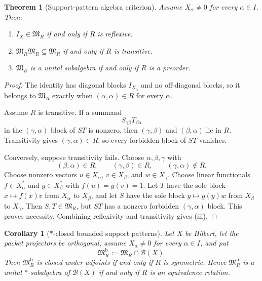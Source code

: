 \documentclass[11pt]{article}
\newtheorem{theorem}{Theorem}[section]
\newtheorem{corollary}[corollary]{Corollary}
\theoremstyle{definition}
\theoremstyle{remark}
\theoremstyle{definition}\newtheorem{example}[theorem]{Example}
\newcommand{\RecordID}[1]{\label{record:#1}}
\newcommand{\Depends}[1]{}
\begin{document}
\begin{theorem}[Support-pattern algebra criterion]
\label{thm:support-pattern}
Assume $X_\alpha\neq0$ for every $\alpha\in I$.  Then:
\begin{enumerate}[label=(\roman*)]
\item $I_X\in\mathfrak M_R$ if and only if $R$ is reflexive.
\item $\mathfrak M_R\mathfrak M_R\subseteq\mathfrak M_R$ if and only if $R$ is transitive.
\item $\mathfrak M_R$ is a unital subalgebra if and only if $R$ is a preorder.
\end{enumerate}
\end{theorem}
\RecordID{PSC-I-T-SUPPORT-PATTERN-ALGEBRA}
\Depends{PSC-I-T-BLOCK-MULTIPLICATION.}

\begin{proof}
The identity has diagonal blocks $I_{X_\alpha}$ and no off-diagonal blocks, so it belongs to $\mathfrak M_R$ exactly when $(\alpha,\alpha)\in R$ for every $\alpha$.

Assume $R$ is transitive.  If a summand
\[
S_{\gamma\beta}T_{\beta\alpha}
\]
in the $(\gamma,\alpha)$ block of $ST$ is nonzero, then $(\gamma,\beta)$ and $(\beta,\alpha)$ lie in $R$.  Transitivity gives $(\gamma,\alpha)\in R$, so every forbidden block of $ST$ vanishes.

Conversely, suppose transitivity fails.  Choose $\alpha,\beta,\gamma$ with
\[
(\beta,\alpha)\in R,
\qquad
(\gamma,\beta)\in R,
\qquad
(\gamma,\alpha)\notin R.
\]
Choose nonzero vectors $u\in X_\alpha$, $v\in X_\beta$, and $w\in X_\gamma$.  Choose linear functionals $f\in X_\alpha^*$ and $g\in X_\beta^*$ with $f(u)=g(v)=1$.  Let $T$ have the sole block $x\mapsto f(x)v$ from $X_\alpha$ to $X_\beta$, and let $S$ have the sole block $y\mapsto g(y)w$ from $X_\beta$ to $X_\gamma$.  Then $S,T\in\mathfrak M_R$, but $ST$ has a nonzero forbidden $(\gamma,\alpha)$ block.  This proves necessity.  Combining reflexivity and transitivity gives (iii).
\end{proof}

\begin{corollary}[$*$-closed bounded support patterns]
\label{cor:star-support}
Let $X$ be Hilbert, let the packet projectors be orthogonal, assume $X_\alpha\neq0$ for every $\alpha\in I$, and put
\[
\mathfrak M_R^{\mathrm b}:=\mathfrak M_R\cap\mathcal B(X).
\]
Then $\mathfrak M_R^{\mathrm b}$ is closed under adjoints if and only if $R$ is symmetric.  Hence $\mathfrak M_R^{\mathrm b}$ is a unital $*$-subalgebra of $\mathcal B(X)$ if and only if $R$ is an equivalence relation.
\end{corollary}
\RecordID{PSC-I-C-SUPPORT-PATTERN-STAR}
\Depends{PSC-I-C-ADJOINT-REVERSAL and PSC-I-T-SUPPORT-PATTERN-ALGEBRA.}
\end{document}
